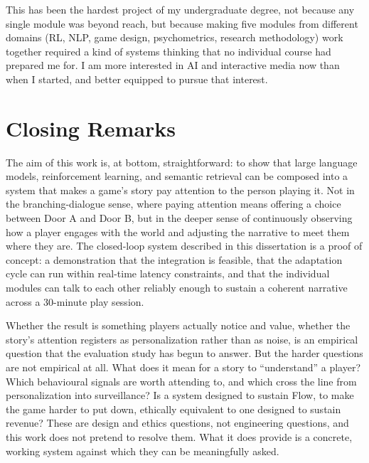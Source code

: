 This has been the hardest project of my undergraduate degree, not because any single module was beyond reach, but because making five modules from different domains (RL, NLP, game design, psychometrics, research methodology) work together required a kind of systems thinking that no individual course had prepared me for. I am more interested in AI and interactive media now than when I started, and better equipped to pursue that interest.

\section{Closing Remarks}

The aim of this work is, at bottom, straightforward: to show that large language models, reinforcement learning, and semantic retrieval can be composed into a system that makes a game's story pay attention to the person playing it. Not in the branching-dialogue sense, where paying attention means offering a choice between Door A and Door B, but in the deeper sense of continuously observing how a player engages with the world and adjusting the narrative to meet them where they are. The closed-loop system described in this dissertation is a proof of concept: a demonstration that the integration is feasible, that the adaptation cycle can run within real-time latency constraints, and that the individual modules can talk to each other reliably enough to sustain a coherent narrative across a 30-minute play session.

Whether the result is something players actually notice and value, whether the story's attention registers as personalization rather than as noise, is an empirical question that the evaluation study has begun to answer. But the harder questions are not empirical at all. What does it mean for a story to ``understand'' a player? Which behavioural signals are worth attending to, and which cross the line from personalization into surveillance? Is a system designed to sustain Flow, to make the game harder to put down, ethically equivalent to one designed to sustain revenue? These are design and ethics questions, not engineering questions, and this work does not pretend to resolve them. What it does provide is a concrete, working system against which they can be meaningfully asked.
